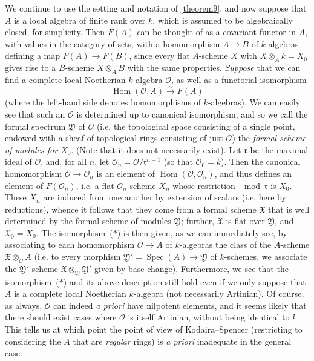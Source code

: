 \documentclass{article}
\theoremstyle{plain}
\theoremstyle{definition}
\newcommand{\sh}[1]{{\mathscr{#1}}}
\newcommand{\cat}[1]{{\mathcal{#1}}}
\newcommand{\fk}{\mathfrak}
\DeclareMathOperator{\Spec}{Spec}
\DeclareMathOperator{\Hom}{Hom}
\begin{document}
We continue to use the setting and notation of \cref{theorem9}, and now suppose that $A$ is a local algebra of finite rank over $k$, which is assumed to be algebraically closed, for simplicity.
Then $F(A)$ can be thought of as a covariant functor in $A$, with values in the category of sets, with a homomorphism $A\to B$ of $k$-algebras defining a map $F(A)\to F(B)$, since every flat $A$-scheme $X$ with $X\otimes_Ak=X_0$ gives rise to a $B$-scheme $X\otimes_AB$ with the same properties.
\emph{Suppose} that we can find a complete local Noetherian $k$-algebra $\cat{O}$, as well as a functorial isomorphism
\[
  \label{isomorphism*}
  \Hom(\cat{O},A) \xrightarrow{\sim} F(A)
  \tag{$*$}
\]
(where the left-hand side denotes homomorphisms of $k$-algebras).
We can easily see that such an $\cat{O}$ is determined up to canonical isomorphism, and so we call the formal spectrum $\fk{Y}$ of $\cat{O}$ (i.e. the topological space consisting of a single point, endowed with a sheaf of topological rings consisting of just $\cat{O}$) the \emph{formal scheme of modules for $X_0$}.
(Note that it does not necessarily exist).
Let $\fk{r}$ be the maximal ideal of $\cat{O}$, and, for all $n$, let $\sh{O}_n=\cat{O}/\fk{r}^{n+1}$ (so that $\sh{O}_0=k$).
Then the canonical homomorphism $\cat{O}\to\sh{O}_n$ is an element of $\Hom(\cat{O},\sh{O}_n)$, and thus defines an element of $F(\sh{O}_n)$, i.e. a flat $\sh{O}_n$-scheme $X_n$ whose restriction $\mod\fk{r}$ is $X_0$.
These $X_n$ are induced from one another by extension of scalars (i.e. here by reductions), whence it follows that they come from a formal scheme $\fk{X}$ that is well determined by the formal scheme of modules $\fk{Y}$;
further, $\fk{X}$ is flat over $\fk{Y}$, and $\fk{X}_0=X_0$.
The \hyperref[isomorphism*]{isomorphism~($*$)} is then given, as we can immediately see, by associating to each homomorphism $\cat{O}\to A$ of $k$-algebras the class of the $A$-scheme $\fk{X}\otimes_{\cat{O}} A$ (i.e. to every morphism $\fk{Y}'=\Spec(A)\to\fk{Y}$ of $k$-schemes, we associate the $\fk{Y}'$-scheme $\fk{X}\otimes_{\fk{Y}}\fk{Y}'$ given by base change).
Furthermore, we see that the \hyperref[isomorphism*]{isomorphism~($*$)} and its above description still hold even if we only suppose that $A$ is a complete local Noetherian $k$-algebra (not necessarily Artinian).
Of course, as always, $\cat{O}$ can indeed \emph{a priori} have nilpotent elements, and it seems likely that there should exist cases where $\cat{O}$ is itself Artinian, without being identical to $k$.
This tells us at which point the point of view of Kodaira--Spencer (restricting to considering the $A$ that are \emph{regular} rings) is \emph{a priori} inadequate in the general case.
\end{document}
